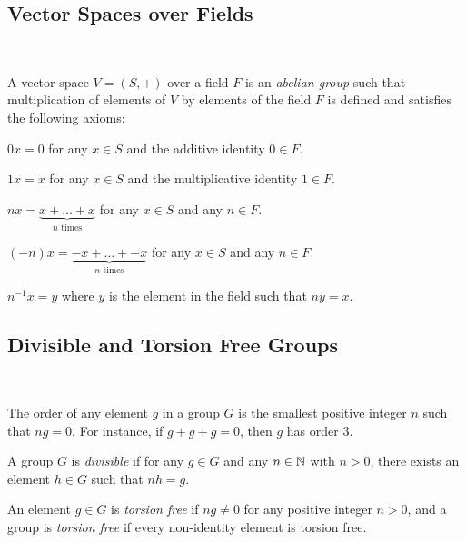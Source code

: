 \subsection{Vector Spaces over Fields}~\label{sec:def-vector-spaces}

A vector space $V = (S, +)$ over a field $F$ is an \emph{abelian group}
such that multiplication of elements of $V$ by elements of the field $F$
is defined and satisfies the following axioms:
\begin{enumroman}
  \item $0 x = 0$ for any $x \in S$ and the additive identity $0 \in F$.
  \item $1 x = x$ for any $x \in S$ and the multiplicative identity $1 \in F$.
  \item $n x = \underbrace{x + \ldots + x}_{\text{$n$ times}}$
    for any $x \in S$ and any $n \in F$.
  \item $(-n) x = \underbrace{-x + \ldots + -x}_{\text{$n$ times}}$
    for any $x \in S$ and any $n \in F$.
  \item $n^{-1} x = y$ where $y$ is the element in the field
    such that $n y = x$.
\end{enumroman}

\subsection{Divisible and Torsion Free Groups}~\label{sec:def-div-groups}

The order of any element $g$ in a group $G$ is the smallest positive
integer $n$ such that $n g = 0$.
For instance, if $g + g + g = 0$, then $g$ has order $3$.

\begin{enumarabic}
  \item A group $G$ is \emph{divisible} if for any $g \in G$
    and any $n \in \mathbb{N}$ with $n > 0$, there exists an element $h \in G$
    such that $n h = g$.
  \item An element $g \in G$ is \emph{torsion free} if $ng \neq 0$
    for any positive integer $n > 0$,
    and a group is \emph{torsion free} if every non-identity element is
    torsion free.
\end{enumarabic}




